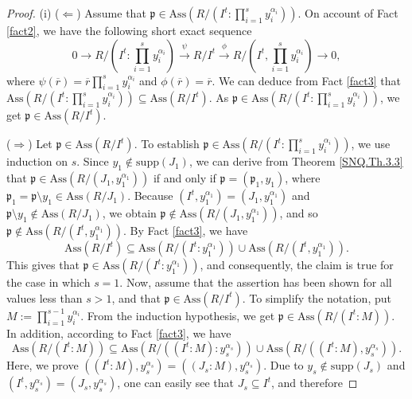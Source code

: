 \documentclass[11pt]{amsart}
\begin{document}
\begin{proof}
(i) ($\Leftarrow$) Assume that  $\mathfrak{p}\in \mathrm{Ass}(R/(I^t: \prod_{i=1}^sy_i^{\alpha_i}))$. On account of  Fact \ref{fact2}, we have the 
 following short exact sequence 
$$0\longrightarrow R/(I^t: \prod_{i=1}^sy_i^{\alpha_i})\stackrel{\psi}{\longrightarrow} R/I^t \stackrel{\phi}{\longrightarrow} R/(I^t, \prod_{i=1}^sy_i^{\alpha_i}) \longrightarrow 0,$$
where $\psi(\overline{r})=\overline{r} \prod_{i=1}^sy_i^{\alpha_i}$ and $\phi(\overline{r})=\overline{r}$.  We can deduce from   Fact \ref{fact3} that 
$\mathrm{Ass}(R/(I^t: \prod_{i=1}^sy_i^{\alpha_i})) \subseteq \mathrm{Ass}(R/I^t)$. 
As  $\mathfrak{p}\in \mathrm{Ass}(R/(I^t: \prod_{i=1}^sy_i^{\alpha_i}))$, we get $\mathfrak{p}\in \mathrm{Ass}(R/I^t)$. 

($\Rightarrow$) Let $\mathfrak{p}\in \mathrm{Ass}(R/I^t)$. To establish  $\mathfrak{p}\in \mathrm{Ass}(R/(I^t: \prod_{i=1}^sy_i^{\alpha_i}))$, we use induction on $s$.  Since $y_1\notin \mathrm{supp}(J_1)$, we can derive from   Theorem \ref{SNQ.Th.3.3}  that  $\mathfrak{p}\in \mathrm{Ass}(R/(J_1, y_1^{\alpha_1}))$ if and only if $\mathfrak{p}=(\mathfrak{p}_1, y_1)$, where $\mathfrak{p}_1=\mathfrak{p}\setminus y_1 \in \mathrm{Ass}(R/J_1)$. 
Because  $(I^t,y_1^{\alpha_1})=(J_1,y_1^{\alpha_1})$ and   $\mathfrak{p}\setminus y_1 \notin \mathrm{Ass}(R/J_1)$, we obtain 
 $\mathfrak{p}\notin \mathrm{Ass}(R/(J_1, y_1^{\alpha_1}))$, and so $\mathfrak{p}\notin \mathrm{Ass}(R/(I^t, y_1^{\alpha_1}))$. 
By    Fact \ref{fact3}, we have 
$$\mathrm{Ass}(R/I^t) \subseteq \mathrm{Ass}(R/(I^t:y_1^{\alpha_1})) \cup \mathrm{Ass}(R/(I^t, y_1^{\alpha_1})).$$
This gives that  $\mathfrak{p}\in \mathrm{Ass}(R/(I^t:y_1^{\alpha_1}))$, and consequently, the claim is true for the case in which $s=1$. Now, assume that the assertion has been shown for  all values  less than $s>1$, and that $\mathfrak{p}\in \mathrm{Ass}(R/I^t)$.  To simplify the notation, put  $M:=\prod_{i=1}^{s-1}y_i^{\alpha_i}$.  From the induction hypothesis, we get  $\mathfrak{p}\in \mathrm{Ass}(R/(I^t:M))$. In addition,  according to  Fact \ref{fact3}, 
we have 
\begin{equation} \label{13}
\mathrm{Ass}(R/(I^t:M))\subseteq \mathrm{Ass}(R/((I^t:M):y_s^{\alpha_s}) )\cup \mathrm{Ass}(R/((I^t:M),y_s^{\alpha_s})).
\end{equation} 
Here, we  prove   $((I^t:M),y_s^{\alpha_s})=((J_s : M),y_s^{\alpha_s}).$  Due to  $y_s\notin \mathrm{supp}(J_s)$ and  
$(I^t,y_s^{\alpha_s})=(J_s, y_s^{\alpha_s})$,  one can easily  see that  $J_s  \subseteq I^t$, and therefore  

\end{proof}
\end{document}
